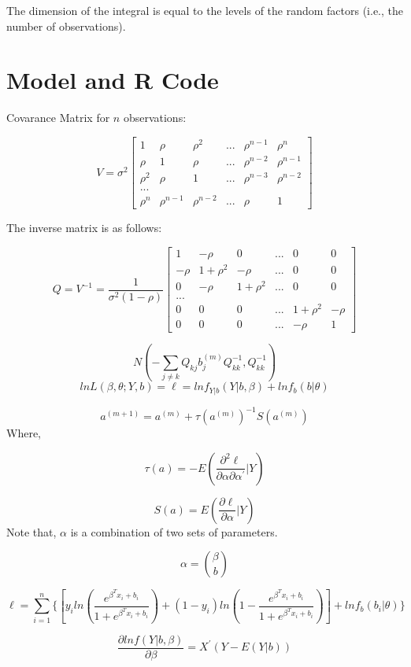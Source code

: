\documentclass[]{book}
\begin{document}
The dimension of the integral is equal to the levels of the random
factors (i.e., the number of observations).

\section{Model and R Code}\label{model-and-r-code}

Covarance Matrix for \(n\) observations:

\[V=\sigma^2 \begin{bmatrix} 1 & \rho & \rho^2 & ... & \rho^{n-1} & \rho^n \\ \rho & 1 & \rho & ... & \rho^{n-2}& \rho^{n-1}\\ \rho^2 & \rho & 1 & ... & \rho^{n-3}& \rho^{n-2} \\ ...\\ \rho^n & \rho^{n-1} & \rho^{n-2} & ... & \rho & 1 \end{bmatrix}\]

The inverse matrix is as follows:

\[Q=V^{-1}=\frac{1}{\sigma^2(1-\rho)} \begin{bmatrix} 1 & -\rho & 0 & ... & 0 & 0 \\ -\rho & 1+\rho^2 & -\rho & ... & 0 & 0\\ 0 & -\rho & 1+\rho^2 & ... & 0 & 0 \\ ...\\ 0 & 0 & 0 & ... & 1+\rho^2 &-\rho\\ 0 & 0 & 0 & ... & -\rho & 1 \end{bmatrix}\]

\[N(-\sum_{j\neq k} Q_{kj}b_j^{(m)}Q_{kk}^{-1},Q_{kk}^{-1})\]
\[ln L(\beta, \theta; Y,b)=\ell=lnf_{Y|b}(Y|b,\beta)+lnf_b(b|\theta)\]

\[a^{(m+1)}=a^{(m)}+\tau(a^{(m)})^{-1} S(a^{(m)})\] Where,

\[\tau(a) = -E(\frac{\partial^2 \ell}{\partial \alpha \partial \alpha^{'}}|Y)\]

\[S(a) = E(\frac{\partial \ell}{\partial \alpha }|Y)\] Note that,
\(\alpha\) is a combination of two sets of parameters.

\[\alpha = \binom{\beta}{b} \]

\[\ell=\sum_{i=1}^{n}\{[y_i ln (\frac{e^{\beta^Tx_i+b_i}}{1+e^{\beta^Tx_i+b_i}}) + (1-y_i) ln(1-\frac{e^{\beta^Tx_i+b_i}}{1+e^{\beta^Tx_i+b_i}})]+lnf_b(b_i|\theta)\}\]

\[\frac{\partial lnf(Y|b, \beta)}{\partial \beta}=X^{'}(Y-E(Y|b))\]
\end{document}

